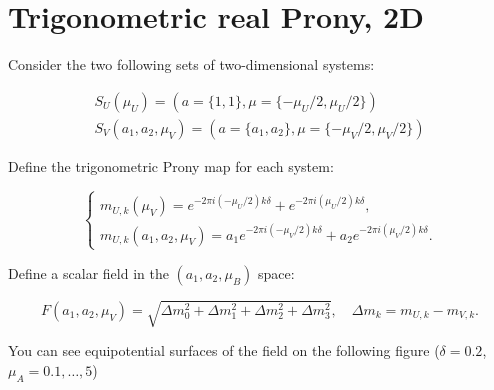 \section{Trigonometric real Prony, 2D}

Consider the two following sets of two-dimensional systems:

$$
\begin{array}{l}
S_U(\mu_U) = (a = \{1, 1\}, \mu = \{ -\mu_U/2, \mu_U/2 \})  \\
S_V(a_1, a_2, \mu_V) = (a = \{a_1, a_2\}, \mu = \{ -\mu_V/2, \mu_V/2 \})
\end{array}
$$

Define the trigonometric Prony map for each system: 

$$
\begin{cases}
m_{U,k}(\mu_V) = e^{-2\pi i (-\mu_U/2) k \delta} + e^{-2\pi i (\mu_U/2) k \delta}, \\
m_{U,k}(a_1, a_2, \mu_V) = a_1 e^{-2\pi i (-\mu_V/2) k \delta} + a_2 e^{-2\pi i (\mu_V/2) k \delta}.
\end{cases}
$$

Define a scalar field in the $(a_1, a_2, \mu_B)$ space:

$$
F(a_1, a_2, \mu_V) = \sqrt{\Delta m_0^2 + \Delta m_1^2 + \Delta m_2^2 + \Delta m_3^2}, \quad \Delta m_k = m_{U,k} - m_{V,k}.
$$

You can see equipotential surfaces of the field on the following figure ($\delta = 0.2$, $\mu_A=0.1, \ldots, 5$)